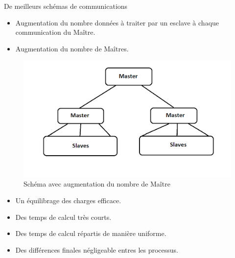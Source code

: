 \begin{frame}
\begin{block}{De meilleurs schémas de communications}
\begin{itemize}
\item Augmentation du nombre données à traiter par un esclave à chaque communication du Maître.\vspace{1em}
\item Augmentation du nombre de Maîtres.
\end{itemize}
\end{block}
\end{frame}

\begin{frame}
\begin{figure}[!ht]	
		\begin{center}\includegraphics[scale=0.55]{Masters2.png}\end{center}
		\caption{Schéma avec augmentation du nombre de Maître}
		\label{fg:fig12}
	\end{figure}
\end{frame}

\begin{frame}
\begin{itemize}
\item Un équilibrage des charges efficace. \vspace{2em}
\item Des temps de calcul très courts.\vspace{2em}
\item Des temps de calcul répartis de manière uniforme. \vspace{2em}
\item Des différences finales négligeable entres les processus.\\
\end{itemize}
\end{frame}

